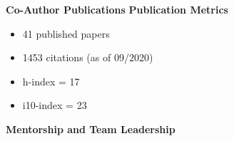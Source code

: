 \documentclass{article}
\begin{document}
{\large  \textbf{Co-Author Publications}}
\vspace{-1em}\vspace{1mm}
\begingroup
  \setlength\bibitemsep{0pt}
  \nocite{*}
  \printbibliography[keyword=coauthor, heading=none]
\endgroup
%
\vspace{-1em}\vspace{3mm}
{\large  \textbf{Publication Metrics}}
\begin{adjustwidth}{5mm}{}
  \begin{multicols}{2}
    \begin{itemize}[noitemsep,topsep=0pt, leftmargin=0mm]
      \item 41 published papers
      \item 1453 citations (as of 09/2020)
      \item h-index = 17
      \item i10-index = 23
    \end{itemize}
  \end{multicols}
\end{adjustwidth}
\vspace{3mm}
{\large  \textbf{Mentorship and Team Leadership}}
\end{document}
